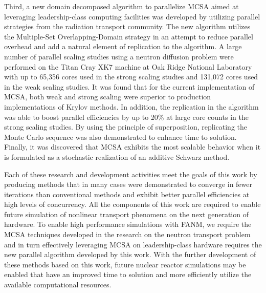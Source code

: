 Third, a new domain decomposed algorithm to parallelize MCSA aimed at
leveraging leadership-class computing facilities was developed by
utilizing parallel strategies from the radiation transport
community. The new algorithm utilizes the Multiple-Set
Overlapping-Domain strategy in an attempt to reduce parallel overhead
and add a natural element of replication to the algorithm. A large
number of parallel scaling studies using a neutron diffusion problem
were performed on the Titan Cray XK7 machine at Oak Ridge National
Laboratory with up to 65,356 cores used in the strong scaling studies
and 131,072 cores used in the weak scaling studies. It was found that
for the current implementation of MCSA, both weak and strong scaling
were superior to production implementations of Krylov methods. In
addition, the replication in the algorithm was able to boost parallel
efficiencies by up to 20\% at large core counts in the strong scaling
studies. By using the principle of superposition, replicating the
Monte Carlo sequence was also demonstrated to enhance time to
solution. Finally, it was discovered that MCSA exhibits the most
scalable behavior when it is formulated as a stochastic realization of
an additive Schwarz method.

Each of these research and development activities meet the goals of
this work by producing methods that in many cases were demonstrated to
converge in fewer iterations than conventional methods and exhibit
better parallel efficiencies at high levels of concurrency. All the
components of this work are required to enable future simulation of
nonlinear transport phenomena on the next generation of hardware. To
enable high performance simulations with FANM, we require the MCSA
techniques developed in the research on the neutron transport problem
and in turn effectively leveraging MCSA on leadership-class hardware
requires the new parallel algorithm developed by this work. With the
further development of these methods based on this work, future
nuclear reactor simulations may be enabled that have an improved time
to solution and more efficiently utilize the available computational
resources.
